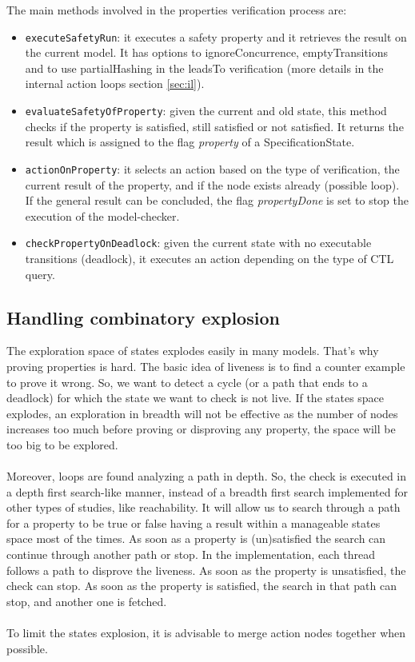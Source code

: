 \documentclass[12pt]{article}
\begin{document}
The main methods involved in the properties verification process are:
\begin{itemize}
	\item \texttt{executeSafetyRun}: it executes a safety property and it retrieves the result on the current model. It has options to ignoreConcurrence, emptyTransitions and to use partialHashing in the leadsTo verification (more details in the internal action loops section \ref{sec:il}).
	\item \texttt{evaluateSafetyOfProperty}: given the current and old state, this method checks if the property is satisfied, still satisfied or not satisfied. It returns the result which is assigned to the flag \textit{property} of a SpecificationState.
	\item \texttt{actionOnProperty}: it selects an action based on the type of verification, the current result of the property, and if the node exists already (possible loop). If the general result can be concluded, the flag \textit{propertyDone} is set to stop the execution of the model-checker.
	\item \texttt{checkPropertyOnDeadlock}: given the current state with no executable transitions (deadlock), it executes an action depending on the type of CTL query.
\end{itemize}

\subsection{Handling combinatory explosion}
The exploration space of states explodes easily in many models. That's why proving properties is hard. The basic idea of liveness is to find a counter example to prove it wrong. So, we want to detect a cycle (or a path that ends to a deadlock) for which the state we want to check is not live. If the states space explodes, an exploration in breadth will not be effective as the number of nodes increases too much before proving or disproving any property, the space will be too big to be explored.
\\\\
Moreover, loops are found analyzing a path in depth. So, the check is executed in a depth first search-like manner, instead of a breadth first search implemented for other types of studies, like reachability. It will allow us to search through a path for a property to be true or false having a result within a manageable states  space most of the times. As soon as a property is (un)satisfied the search can continue through another path or stop. In the implementation, each thread follows a path to disprove the liveness. As soon as the property is unsatisfied, the check can stop. As soon as the property is satisfied, the search in that path can stop, and another one is fetched.
\\\\
To limit the states explosion, it is advisable to merge action nodes together when possible.
\end{document}
